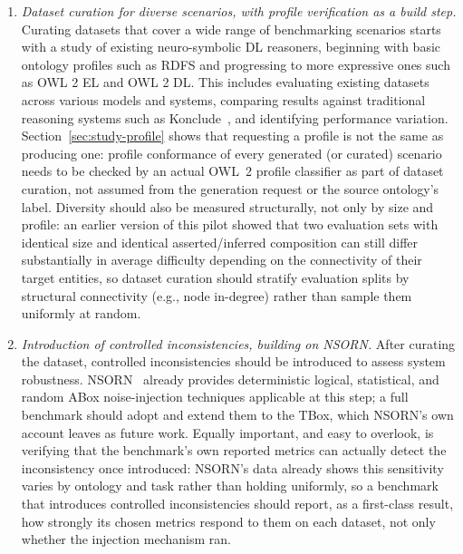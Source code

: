 \begin{enumerate}
\item \textit{Dataset curation for diverse scenarios, with profile verification as a build step.} Curating datasets that cover a wide range of benchmarking scenarios starts with a study of existing neuro-symbolic DL reasoners, beginning with basic ontology profiles such as RDFS and progressing to more expressive ones such as OWL 2 EL and OWL 2 DL. This includes evaluating existing datasets across various models and systems, comparing results against traditional reasoning systems such as Konclude~\cite{konclude}, and identifying performance variation. Section~\ref{sec:study-profile} shows that requesting a profile is not the same as producing one: profile conformance of every generated (or curated) scenario needs to be checked by an actual OWL~2 profile classifier as part of dataset curation, not assumed from the generation request or the source ontology's label. Diversity should also be measured structurally, not only by size and profile: an earlier version of this pilot showed that two evaluation sets with identical size and identical asserted/inferred composition can still differ substantially in average difficulty depending on the connectivity of their target entities, so dataset curation should stratify evaluation splits by structural connectivity (e.g., node in-degree) rather than sample them uniformly at random.

\item \textit{Introduction of controlled inconsistencies, building on NSORN.} After curating the dataset, controlled inconsistencies should be introduced to assess system robustness. NSORN~\cite{loesch2024nsorn} already provides deterministic logical, statistical, and random ABox noise-injection techniques applicable at this step; a full benchmark should adopt and extend them to the TBox, which NSORN's own account leaves as future work. Equally important, and easy to overlook, is verifying that the benchmark's own reported metrics can actually detect the inconsistency once introduced: NSORN's data already shows this sensitivity varies by ontology and task rather than holding uniformly, so a benchmark that introduces controlled inconsistencies should report, as a first-class result, how strongly its chosen metrics respond to them on each dataset, not only whether the injection mechanism ran.


\end{enumerate}
